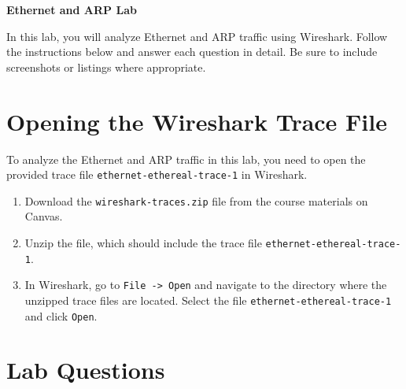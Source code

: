 \documentclass[12pt]{article}
\begin{document}
\begin{center}
      \Large \textbf{Ethernet and ARP Lab}
\end{center}

\vspace{1cm}

In this lab, you will analyze Ethernet and ARP traffic using Wireshark. Follow the instructions below and answer each question in detail. Be sure to include screenshots or listings where appropriate.

\section*{Opening the Wireshark Trace File}

To analyze the Ethernet and ARP traffic in this lab, you need to open the provided trace file \texttt{ethernet-ethereal-trace-1} in Wireshark.

\begin{enumerate}
      \item Download the \texttt{wireshark-traces.zip} file from the course materials on Canvas.
      \item Unzip the file, which should include the trace file \texttt{ethernet-ethereal-trace-1}.
      \item In Wireshark, go to \texttt{File -> Open} and navigate to the directory where the unzipped trace files are located. Select the file \texttt{ethernet-ethereal-trace-1} and click \texttt{Open}.
\end{enumerate}

\section*{Lab Questions}
\end{document}
